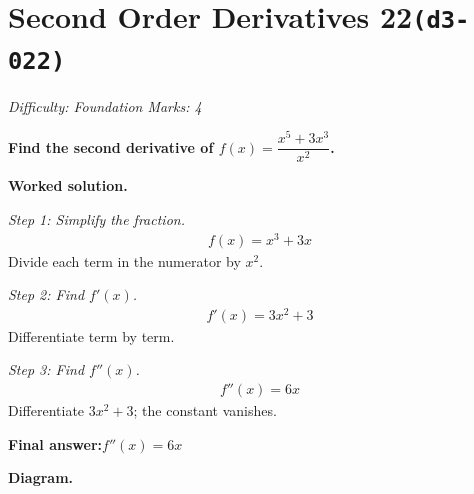 \documentclass[11pt]{article}
\newcommand{\question}[1]{\par\medskip\noindent\textbf{#1}\par}
\begin{document}
\section*{Second Order Derivatives 22\quad\small\texttt{(d3-022)}}
\textit{Difficulty: Foundation \quad\textbar\quad Marks: 4}

\question{Find the second derivative of \( f(x) = \dfrac{x^5 + 3x^3}{x^2} \).}

\textbf{Worked solution.}

\textit{Step 1: Simplify the fraction.}
\[\begin{gathered}
f(x) = x^3 + 3x
\end{gathered}\]
Divide each term in the numerator by \( x^2 \).

\textit{Step 2: Find \( f'(x) \).}
\[\begin{gathered}
f'(x) = 3x^2 + 3
\end{gathered}\]
Differentiate term by term.

\textit{Step 3: Find \( f''(x) \).}
\[\begin{gathered}
f''(x) = 6x
\end{gathered}\]
Differentiate \(3x^2 + 3\); the constant vanishes.

\begin{answerbox}
\textbf{Final answer:}\quad \(\displaystyle  f''(x) = 6x \)
\end{answerbox}
\textbf{Diagram.}
\end{document}
